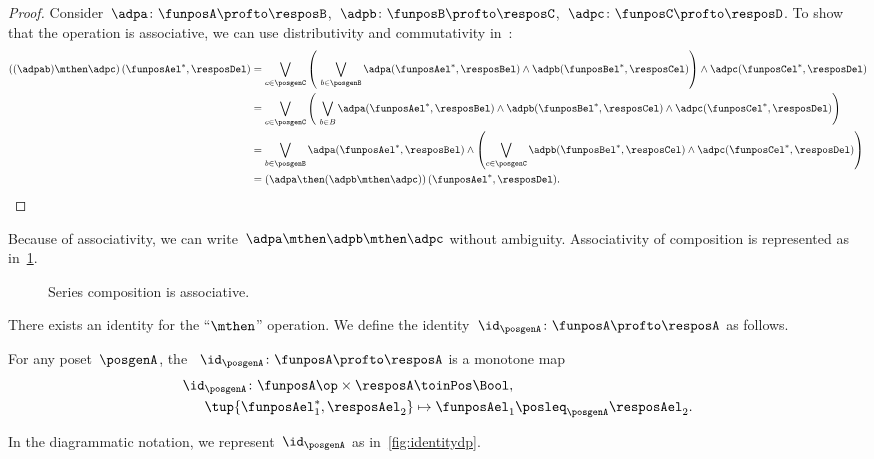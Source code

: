 \begin{proof}
  Consider~$\adpa\colon \funposA\profto \resposB$,~$\adpb\colon \funposB \profto \resposC$,~$\adpc\colon \funposC\profto \resposD$.
  To show that the operation is associative, we can use distributivity and commutativity in~\Bool:
%
  \begin{equation}
    \label{eq:dp_associativity}
    \begin{aligned}
      \left((\adpab) \mthen \adpc\right) (\funposAel^*,\resposDel)
      &= \bigvee_{c \in \posgenC} \left (\ \bigvee_{b\in \posgenB} \adpa(\funposAel^*,\resposBel) \wedge \adpb(\funposBel^*,\resposCel) \right )  \wedge  \adpc (\funposCel^*, \resposDel) \\
      &= \bigvee_{c \in \posgenC} \left (\ \bigvee_{b\in B } \adpa(\funposAel^*,\resposBel)
      \wedge \adpb(\funposBel^*,\resposCel) \wedge \adpc (\funposCel^*, \resposDel)
      \right ) \\
      &= \bigvee_{b \in \posgenB } \adpa(\funposAel^*,\resposBel) \wedge \left ( \bigvee_{c\in \posgenC} \adpb(\funposBel^*,\resposCel) \wedge \adpc (\funposCel^*, \resposDel) \right ) \\
      &= \left(\adpa \then (\adpb \mthen \adpc )\right) (\funposAel^*, \resposDel).
    \end{aligned}
  \end{equation}
%
\end{proof}

Because of associativity, we can write~$\adpa\mthen \adpb\mthen \adpc$ without ambiguity.
Associativity of composition is represented as in~\cref{fig:compositionassociativity}.

\begin{figure}[h!]
  \begin{center}
  \end{center}
  \caption{Series composition is associative. \label{fig:compositionassociativity}}
\end{figure}

There exists an identity for the ``$\mthen$'' operation.
We define the identity~$\id_\posgenA \colon \funposA \profto \resposA$ as follows.

\begin{definition}
  \label{def:dp-identity}
  For any poset~$\posgenA$, the \emph{}~$\id_\posgenA \colon \funposA \profto \resposA$ is a monotone map
  \begin{equation}
    \begin{aligned}
      \id_\posgenA \colon \funposA\op \times \resposA & \toinPos   \Bool, \label{eq:identity}\\
      \tup{\funposAel_1^*, \resposAel_2} & \mapsto \funposAel_1 \posleq_{\posgenA} \resposAel_2.
    \end{aligned}
  \end{equation}
\end{definition}
In the diagrammatic notation, we represent~$\id_\posgenA$ as in~\cref{fig:identitydp}.

